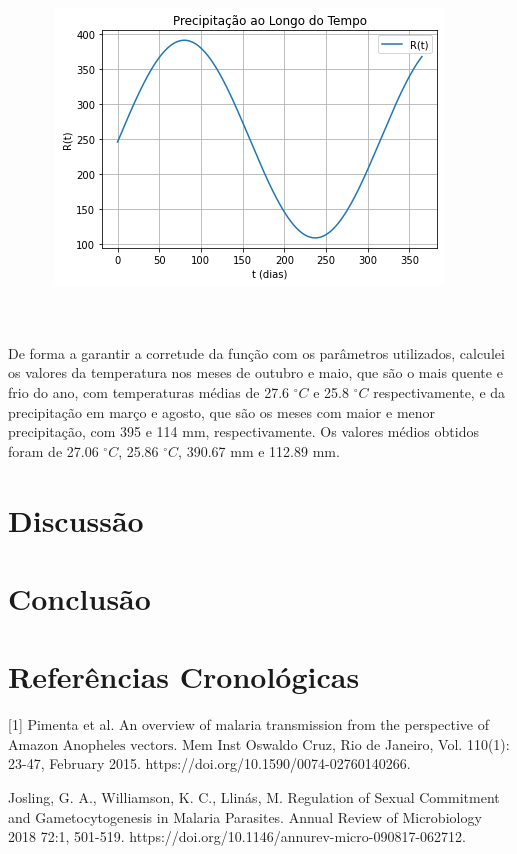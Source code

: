 \documentclass[12pt]{article}
\begin{document}
\begin{figure}[!ht]
        \centering
        \hbox{\hspace{4.0em} \includegraphics[scale=0.6] {Grafico_da_Precipitacao.png}}
\end{figure} 
\\\\De forma a garantir a corretude da função com os parâmetros utilizados, calculei os valores da temperatura nos meses de outubro e maio, que são o mais quente e frio do ano, com temperaturas médias de 27.6 $^\circ C$ e 25.8 $^\circ C$ respectivamente, e da precipitação em março e agosto, que são os meses com maior e menor precipitação, com 395 e 114 mm, respectivamente. Os valores médios obtidos foram de 27.06 $^\circ C$, 25.86 $^\circ C$, 390.67 mm e 112.89 mm.

\newpage
\section{Discussão}

\newpage
\section{Conclusão}


\newpage

\section{Referências Cronológicas}
[1] Pimenta et al. An overview of malaria transmission from the perspective of Amazon $\text{Anopheles vectors}$. Mem Inst Oswaldo Cruz, Rio de Janeiro, Vol. 110(1): 23-47, February 2015. https://doi.org/10.1590/0074-02760140266.  

\noindent [2] Josling, G. A., Williamson, K. C., Llinás, M. Regulation of Sexual Commitment and Gametocytogenesis in Malaria Parasites. Annual Review of Microbiology 2018 72:1, 501-519. https://doi.org/10.1146/annurev-micro-090817-062712. 
\end{document}
